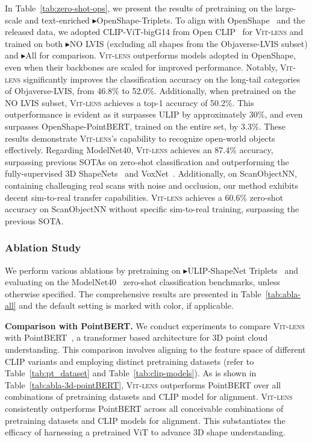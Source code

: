 \documentclass{article}
\newcommand{\clipvit}{CLIP-ViT\xspace}
\newcommand{\vit}{ViT\xspace}
\newcommand{\methodname}{{\scshape Vit-lens}\xspace}
\newcommand{\dsA}{\textcolor{myyellow}{$\blacktriangleright$}}
\newcommand{\dsC}{{\textcolor{mypurpledeep}{$\blacktriangleright$}}}
\begin{document}
In Table~\ref{tab:zero-shot-ops}, we present the results of pretraining on the large-scale and text-enriched \dsC OpenShape-Triplets. To align with OpenShape~\cite{liu2023openshape} and the released data, we adopted \clipvit-bigG14 from Open CLIP~\cite{cherti2022openclip} for \methodname and trained on both \dsC NO LVIS (excluding all shapes from the Objaverse-LVIS subset) and \dsC All for comparison. \methodname outperforms models adopted in OpenShape, even when their backbones are scaled for improved performance. 
Notably, \methodname significantly improves the classification accuracy on the long-tail categories of Objaverse-LVIS, from 46.8\% to 52.0\%. Additionally, when pretrained on the NO LVIS subset, \methodname achieves a top-1 accuracy of 50.2\%. This outperformance is evident as it surpasses ULIP by approximately 30\%, and even surpasses OpenShape-PointBERT, trained on the entire set, by 3.3\%.  These results demonstrate \methodname's capability to recognize open-world objects effectively.
Regarding ModelNet40, \methodname achieves an 87.4\% accuracy, surpassing previous SOTAs on zero-shot classification and outperforming the fully-supervised 3D ShapeNets~\cite{wu2015modelnet} and VoxNet~\cite{maturana2015voxnet}. Additionally, on ScanObjectNN, containing challenging real scans with noise and occlusion, our method exhibits decent sim-to-real transfer capabilities. \methodname achieves a 60.6\% zero-shot accuracy on ScanObjectNN without specific sim-to-real training, surpassing the previous SOTA.


\subsubsection{Ablation Study}
We perform various ablations by pretraining on \dsA ULIP-ShapeNet Triplets~\cite{xue2023ulip} and evaluating on the ModelNet40~\cite{wu2015modelnet} zero-shot classification benchmarks, unless otherwise specified. The comprehensive results are presented in Table~\ref{tab:abla-all} and the default setting is marked with \colorbox{lavenderweb}{color}, if applicable.

\textbf{Comparison with PointBERT.} We conduct experiments to compare \methodname with PointBERT~\cite{yu2022pointbert}, a transformer based architecture for 3D point cloud understanding. This comparison involves aligning to the feature space of different CLIP variants and employing distinct pretraining datasets (refer to Table~\ref{tab:pt_dataset} and Table~\ref{tab:clip-models}).
As is shown in Table~\ref{tab:abla-3d-pointBERT}, \methodname outperforms PointBERT over all combinations of pretraining datasets and CLIP model for alignment. \methodname consistently outperforms PointBERT across all conceivable combinations of pretraining datasets and CLIP models for alignment. This substantiates the efficacy of harnessing a pretrained \vit to advance 3D shape understanding.
\end{document}
